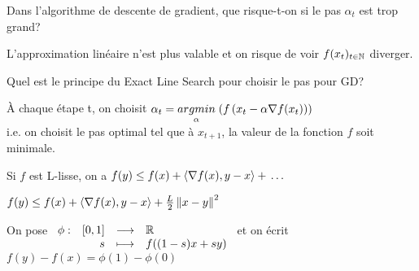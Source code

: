 \begin{note}
  \begin{field}
    Dans l'algorithme de descente de gradient, que risque-t-on si le
    pas $\alpha_t$ est trop grand?
  \end{field}
  \begin{field}
    L'approximation linéaire n'est plus valable et on risque de voir
    $f(x_t)_{t\in\mathbb{N}}$ diverger.
  \end{field}
  \begin{field}

  \end{field}
\end{note}

\begin{note}
  \begin{field}
    Quel est le principe du Exact Line Search pour choisir le pas pour
    GD?
  \end{field}
  \begin{field}
    À chaque étape t, on choisit $\alpha_t = \underset{\alpha}{argmin}\;(f\left(x_t -
    \alpha\nabla f(x_t)\right))$
    \\
    i.e. on choisit le pas optimal tel que à $x_{t+1}$, la valeur de
    la fonction $f$ soit minimale.
  \end{field}
  \begin{field}

  \end{field}
\end{note}

\begin{note}
  \begin{field}
    Si $f$ est L-lisse, on a $f(y) \leq f(x) + \dotp{\nabla f(x)}{y-x}
      + \dots$
  \end{field}
  \begin{field}
    $f(y) \leq f(x) + \langle\nabla f(x),y-x\rangle
      + \frac{L}{2}\left\lVert x-y\right\rVert^2$
  \end{field}
  \begin{field}
    On pose $\begin{array}[t]{lrcl} \phi: & [0,1] & \longrightarrow & \mathbb{R} \\ & s & \longmapsto & f((1-s)x+sy) \end{array}$ et on écrit
    $f(y)-f(x) = \phi(1) - \phi(0)$
  \end{field}
\end{note}

